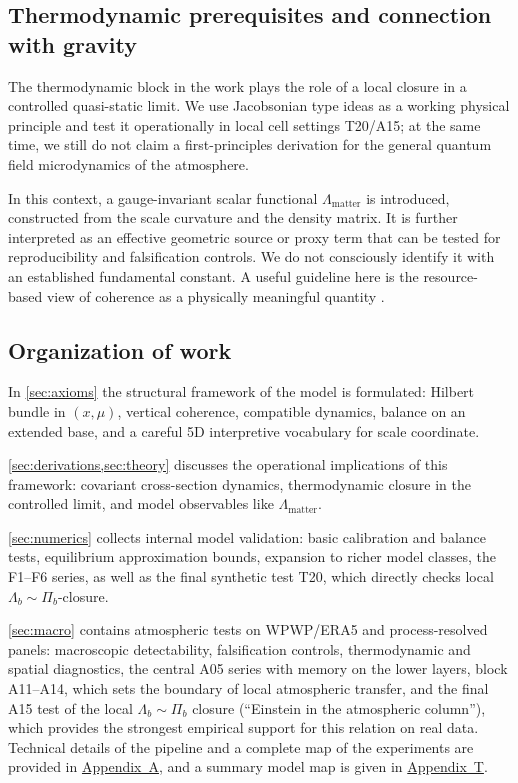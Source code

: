 \documentclass[11pt,a4paper]{article}
\theoremstyle{definition}
\theoremstyle{plain}
\theoremstyle{remark}
\begin{document}
\subsection{Thermodynamic prerequisites and connection with gravity}

The thermodynamic block in the work plays the role of a local closure in a controlled quasi-static limit. We use Jacobsonian type ideas \cite{Jacobson1995EinsteinEOS,ElingGuedensJacobson2009NonEq} as a working physical principle and test it operationally in local cell settings T20/A15; at the same time, we still do not claim a first-principles derivation for the general quantum field microdynamics of the atmosphere.

In this context, a gauge-invariant scalar functional $\Lambda_{\mathrm{matter}}$ is introduced, constructed from the scale curvature and the density matrix. It is further interpreted as an effective geometric source or proxy term that can be tested for reproducibility and falsification controls. We do not consciously identify it with an established fundamental constant. A useful guideline here is the resource-based view of coherence as a physically meaningful quantity \cite{BaumgratzCramerPlenio2014QuantifyingCoherence}.

\subsection{Organization of work}

In \cref{sec:axioms} the structural framework of the model is formulated: Hilbert bundle in $(x,\mu)$, vertical coherence, compatible dynamics, balance on an extended base, and a careful 5D interpretive vocabulary for scale coordinate.

\cref{sec:derivations,sec:theory} discusses the operational implications of this framework: covariant cross-section dynamics, thermodynamic closure in the controlled limit, and model observables like $\Lambda_{\mathrm{matter}}$.

\cref{sec:numerics} collects internal model validation: basic calibration and balance tests, equilibrium approximation bounds, expansion to richer model classes, the F1--F6 series, as well as the final synthetic test T20, which directly checks local $\Lambda_b\sim\Pi_b$-closure.

\cref{sec:macro} contains atmospheric tests on WPWP/ERA5 and process-resolved panels: macroscopic detectability, falsification controls, thermodynamic and spatial diagnostics, the central A05 series with memory on the lower layers, block A11--A14, which sets the boundary of local atmospheric transfer, and the final A15 test of the local $\Lambda_b\sim\Pi_b$ closure (``Einstein in the atmospheric column''), which provides the strongest empirical support for this relation on real data. Technical details of the pipeline and a complete map of the experiments are provided in \hyperref[sec:appendix:atmo]{Appendix~A}, and a summary model map is given in \hyperref[sec:appendix:toy]{Appendix~T}.
\end{document}
